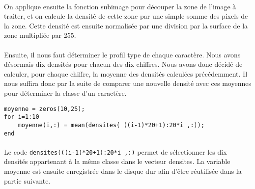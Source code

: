\paragraph{}
On applique ensuite la fonction subimage pour découper la zone de l'image à traiter, et on calcule la densité de cette zone par une simple somme des pixels 
de la zone. Cette densité est ensuite normalisée par une division par la surface de la zone multipliée par 255.

\paragraph{}
Ensuite, il nous faut déterminer le profil type de chaque caractère. Nous avons désormais dix densités pour chacun des dix chiffres. Nous avons donc 
décidé de calculer, pour chaque chiffre, la moyenne des densités calculées précédemment. Il nous suffira donc par la suite de comparer une nouvelle densité 
avec ces moyennes pour déterminer la classe d'un caractère.
\\
\begin{lstlisting}
moyenne = zeros(10,25);
for i=1:10
    moyenne(i,:) = mean(densites( ((i-1)*20+1):20*i ,:));
end
\end{lstlisting}

\paragraph{}
Le code \verb?densites(((i-1)*20+1):20*i ,:)? permet de sélectionner les dix densités appartenant à la même classe dans le vecteur densites.
La variable moyenne est ensuite enregistrée dans le disque dur afin d'être réutilisée dans la partie suivante.







